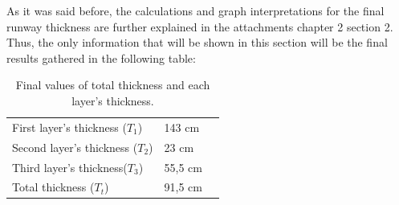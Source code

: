		As it was said before, the calculations and graph interpretations for the final runway thickness are further explained in the attachments chapter 2 section 2. Thus, the only information that will be shown in this section will be the final results gathered in the following table:
	
		\begin{table}[htb]
			\centering
			\begin{tabular}{ll p{5cm}}
				\midrule[2pt]
				First layer's thickness (\(T_1\))& 143 cm\\
				Second layer's thickness (\(T_2\)) & 23 cm\\
				Third layer's thickness(\(T_3\))& 55,5 cm \\
				Total thickness (\(T_t\))& 91,5 cm\\
				\bottomrule[2pt]
			\end{tabular}
			\caption{Final values of total thickness and each layer's thickness.}
			\label{}
		\end{table}
		
		